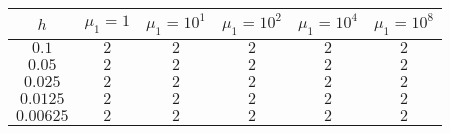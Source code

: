\begin{tabular}{cccccc}
  \toprule
  $h$ & $\mu_1=1$ & $\mu_1=10^1$ & $\mu_1=10^2$ & $\mu_1=10^4$ & $\mu_1=10^8$ \\
  \midrule
  $0.1$     & $2$ & $2$ & $2$ & $2$ & $2$ \\
  $0.05$    & $2$ & $2$ & $2$ & $2$ & $2$ \\
  $0.025$   & $2$ & $2$ & $2$ & $2$ & $2$ \\
  $0.0125$  & $2$ & $2$ & $2$ & $2$ & $2$ \\
  $0.00625$ & $2$ & $2$ & $2$ & $2$ & $2$ \\
  \bottomrule
\end{tabular}


